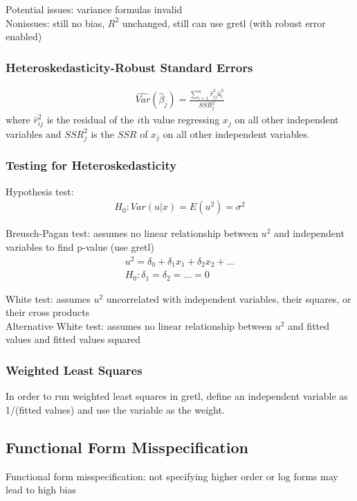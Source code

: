 \documentclass[12pt]{article}
\numberwithin{equation}{section}
\begin{document}
Potential issues: variance formulas invalid \\
Nonissues: still no bias, $R^2$ unchanged, still can use gretl (with robust error enabled)

\subsubsection{Heteroskedasticity-Robust Standard Errors}
\begin{gather}
    \widehat{Var}(\hat{\beta}_j) = \frac{\sum_{i=1}^{n} \hat{r}_{ij}^{2} \hat{u}_i^2}{SSR_j^2}
\end{gather}
where $\hat{r}_{ij}^{2}$ is the residual of the $i$th value regressing $x_j$ on all other independent variables and $SSR_j^2$ is the $SSR$ of $x_j$ on all other independent variables.

\subsubsection{Testing for Heteroskedasticity}
Hypothesis test:
\begin{gather}
    H_0 : Var(u|x) = E(u^2) = \sigma^2
\end{gather}

Breusch-Pagan test: assumes no linear relationship between $u^2$ and independent variables to find p-value (use gretl)
\begin{gather}
    u^2 = \delta_0 + \delta_1 x_1 + \delta_2 x_2 + ... \\
    H_0 : \delta_1 = \delta_2 = ... = 0
\end{gather}

White test: assumes $u^2$ uncorrelated with independent variables, their squares, or their cross products \\[0.5cm]
Alternative White test: assumes no linear relationship between $u^2$ and fitted values and fitted values squared

\subsubsection{Weighted Least Squares}
In order to run weighted least squares in gretl, define an independent variable as 1/(fitted values) and use the variable as the weight.

\subsection{Functional Form Misspecification}
Functional form misspecification: not specifying higher order or log forms may lead to high bias
\end{document}
